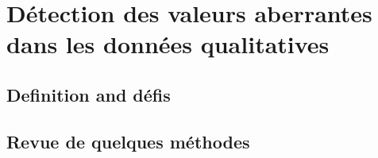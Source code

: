 \section{Détection des valeurs aberrantes dans les données qualitatives}
%
\subsection{Definition and défis}
%

\subsection{Revue de quelques méthodes}
